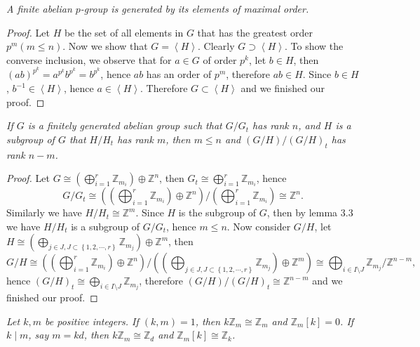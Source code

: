 \begin{problem}\em
A finite abelian $p$-group is generated by its elements of maximal order.
\end{problem}
\begin{proof}
Let $H$ be the set of all elements in $G$ that has the greatest order $p^m(m\le n)$. Now we show that $G=\left<H\right>$. Clearly $G\supset\left<H\right>$. To show the converse inclusion, we observe that for $a\in G$ of order $p^k$, let $b\in H$, then $(ab)^{p^k}=a^{p^k}b^{p^k}=b^{p^k}$, hence $ab$ has an order of $p^m$, therefore $ab\in H$. Since $b\in H$, $b^{-1}\in\left<H\right>$, hence $a\in\left<H\right>$. Therefore $G\subset\left<H\right>$ and we finished our proof.
\end{proof}
\begin{problem}\em
If $G$ is a finitely generated abelian group such that $G/G_t$ has rank $n$, and $H$ is a subgroup of $G$ that $H/H_t$ has rank $m$, then $m\le n$ and $(G/H)/(G/H)_t$ has rank $n-m$.
\end{problem}
\begin{proof}
Let $G\cong \left( \bigoplus_{i=1}^r{\mathbb{Z} _{m_i}} \right) \oplus \mathbb{Z} ^n$, then $G_t\cong \bigoplus_{i=1}^r{\mathbb{Z} _{m_i}}$, hence 
$$
G/G_t\cong {{\left( \left( \bigoplus_{i=1}^r{\mathbb{Z} _{m_i}} \right) \oplus \mathbb{Z} ^n \right)}/{\left( \bigoplus_{i=1}^r{\mathbb{Z} _{m_i}} \right)}}\cong \mathbb{Z} ^n.
$$
Similarly we have $H/H_t\cong \mathbb{Z} ^m$. Since $H$ is the subgroup of $G$, then by lemma 3.3 we have $H/H_t$ is a subgroup of $G/G_t$, hence $m\le n$. Now consider $G/H$, let $H\cong \left( \bigoplus_{j\in J,J\subset \left\{ 1,2,\cdots ,r \right\}}{\mathbb{Z} _{m_j}} \right) \oplus \mathbb{Z} ^m$, then 
$$
G/H\cong {{\left( \left( \bigoplus_{i=1}^r{\mathbb{Z} _{m_i}} \right) \oplus \mathbb{Z} ^n \right)}/{\left( \left( \bigoplus_{j\in J,J\subset \left\{ 1,2,\cdots ,r \right\}}{\mathbb{Z} _{m_j}} \right) \oplus \mathbb{Z} ^m \right)}}\cong {{\bigoplus_{i\in I\setminus J}{\mathbb{Z} _{m_j}}}/{\mathbb{Z} ^{n-m}}},
$$
hence $\left( G/H \right) _t\cong \bigoplus_{i\in I\setminus J}{\mathbb{Z} _{m_j}}$, therefore $\left( G/H \right) /\left( G/H \right) _t\cong \mathbb{Z} ^{n-m}$ and we finished our proof.
\end{proof}
\begin{problem}\em
Let $k,m$ be positive integers. If $(k,m)=1$, then $k\mathbb{Z}_m\cong\mathbb{Z}_m$ and $\mathbb{Z}_m[k]=0$. If $k\mid m$, say $m=kd$, then $k\mathbb{Z}_m\cong\mathbb{Z}_d$ and $\mathbb{Z}_m[k]\cong\mathbb{Z}_k$.
\end{problem}
